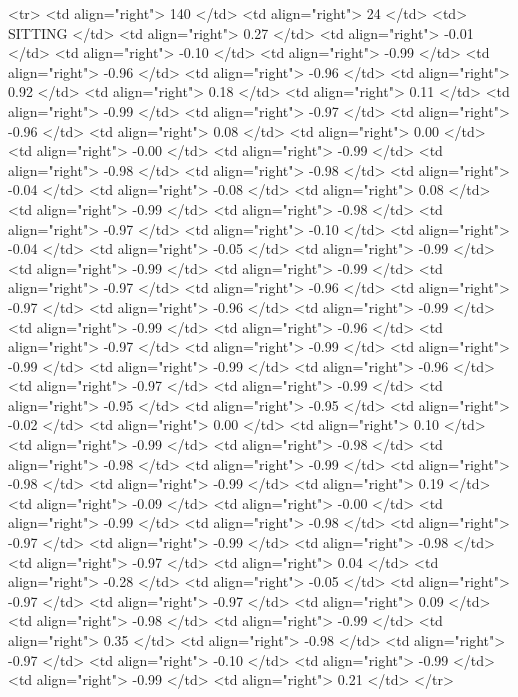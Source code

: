   <tr> <td align="right"> 140 </td> <td align="right">  24 </td> <td> SITTING </td> <td align="right"> 0.27 </td> <td align="right"> -0.01 </td> <td align="right"> -0.10 </td> <td align="right"> -0.99 </td> <td align="right"> -0.96 </td> <td align="right"> -0.96 </td> <td align="right"> 0.92 </td> <td align="right"> 0.18 </td> <td align="right"> 0.11 </td> <td align="right"> -0.99 </td> <td align="right"> -0.97 </td> <td align="right"> -0.96 </td> <td align="right"> 0.08 </td> <td align="right"> 0.00 </td> <td align="right"> -0.00 </td> <td align="right"> -0.99 </td> <td align="right"> -0.98 </td> <td align="right"> -0.98 </td> <td align="right"> -0.04 </td> <td align="right"> -0.08 </td> <td align="right"> 0.08 </td> <td align="right"> -0.99 </td> <td align="right"> -0.98 </td> <td align="right"> -0.97 </td> <td align="right"> -0.10 </td> <td align="right"> -0.04 </td> <td align="right"> -0.05 </td> <td align="right"> -0.99 </td> <td align="right"> -0.99 </td> <td align="right"> -0.99 </td> <td align="right"> -0.97 </td> <td align="right"> -0.96 </td> <td align="right"> -0.97 </td> <td align="right"> -0.96 </td> <td align="right"> -0.99 </td> <td align="right"> -0.99 </td> <td align="right"> -0.96 </td> <td align="right"> -0.97 </td> <td align="right"> -0.99 </td> <td align="right"> -0.99 </td> <td align="right"> -0.99 </td> <td align="right"> -0.96 </td> <td align="right"> -0.97 </td> <td align="right"> -0.99 </td> <td align="right"> -0.95 </td> <td align="right"> -0.95 </td> <td align="right"> -0.02 </td> <td align="right"> 0.00 </td> <td align="right"> 0.10 </td> <td align="right"> -0.99 </td> <td align="right"> -0.98 </td> <td align="right"> -0.98 </td> <td align="right"> -0.99 </td> <td align="right"> -0.98 </td> <td align="right"> -0.99 </td> <td align="right"> 0.19 </td> <td align="right"> -0.09 </td> <td align="right"> -0.00 </td> <td align="right"> -0.99 </td> <td align="right"> -0.98 </td> <td align="right"> -0.97 </td> <td align="right"> -0.99 </td> <td align="right"> -0.98 </td> <td align="right"> -0.97 </td> <td align="right"> 0.04 </td> <td align="right"> -0.28 </td> <td align="right"> -0.05 </td> <td align="right"> -0.97 </td> <td align="right"> -0.97 </td> <td align="right"> 0.09 </td> <td align="right"> -0.98 </td> <td align="right"> -0.99 </td> <td align="right"> 0.35 </td> <td align="right"> -0.98 </td> <td align="right"> -0.97 </td> <td align="right"> -0.10 </td> <td align="right"> -0.99 </td> <td align="right"> -0.99 </td> <td align="right"> 0.21 </td> </tr>
